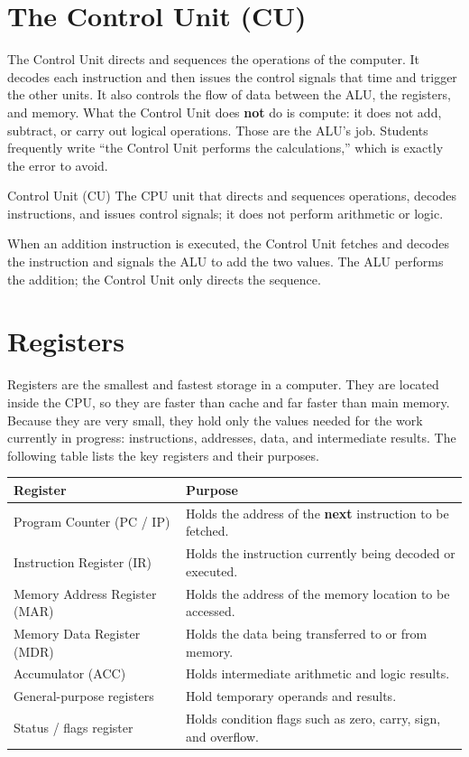 \section{The Control Unit (CU)}
The Control Unit directs and sequences the operations of the computer. It
decodes each instruction and then issues the control signals that time and
trigger the other units. It also controls the flow of data between the ALU,
the registers, and memory. What the Control Unit does \textbf{not} do is
compute: it does not add, subtract, or carry out logical operations. Those
are the ALU's job. Students frequently write ``the Control Unit performs the
calculations,'' which is exactly the error to avoid.

\begin{definitionbox}{Control Unit (CU)}
The CPU unit that directs and sequences operations, decodes instructions,
and issues control signals; it does not perform arithmetic or logic.
\end{definitionbox}

\begin{example}
When an addition instruction is executed, the Control Unit fetches and
decodes the instruction and signals the ALU to add the two values. The ALU
performs the addition; the Control Unit only directs the sequence.
\end{example}

\section{Registers}
Registers are the smallest and fastest storage in a computer. They are
located inside the CPU, so they are faster than cache and far faster than
main memory. Because they are very small, they hold only the values needed
for the work currently in progress: instructions, addresses, data, and
intermediate results. The following table lists the key registers and their
purposes.

\begin{center}
\begin{tabular}{p{}p{}}
\toprule
\textbf{Register} & \textbf{Purpose} \\
\midrule
Program Counter (PC / IP) & Holds the address of the \textbf{next} instruction to be fetched. \\
Instruction Register (IR) & Holds the instruction currently being decoded or executed. \\
Memory Address Register (MAR) & Holds the address of the memory location to be accessed. \\
Memory Data Register (MDR) & Holds the data being transferred to or from memory. \\
Accumulator (ACC) & Holds intermediate arithmetic and logic results. \\
General-purpose registers & Hold temporary operands and results. \\
Status / flags register & Holds condition flags such as zero, carry, sign, and overflow. \\
\bottomrule
\end{tabular}
\end{center}

